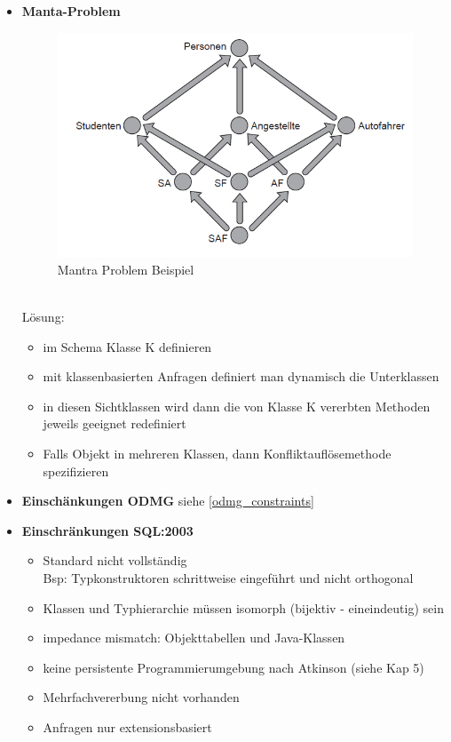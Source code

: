\begin{itemize}
	\item \textbf{Manta-Problem}
	\begin{figure}[!h]
		\centering
		\includegraphics[scale=0.5]{img/mantra_problem_ex.png}
		\caption{Mantra Problem Beispiel}
	\end{figure}\\
	Lösung:
	\begin{itemize}
		\item im Schema Klasse K definieren
		\item mit klassenbasierten Anfragen definiert man dynamisch die Unterklassen
		\item in diesen Sichtklassen wird dann die von Klasse K vererbten Methoden jeweils geeignet redefiniert
		\item Falls Objekt in mehreren Klassen, dann Konfliktauflösemethode spezifizieren
	\end{itemize}
	
	\item \textbf{Einschänkungen ODMG} siehe \ref{odmg_constraints}
	
	\item \textbf{Einschränkungen SQL:2003}
	\begin{itemize}
		\item Standard nicht vollständig \\
		Bsp: Typkonstruktoren schrittweise eingeführt und nicht orthogonal
		\item Klassen und Typhierarchie müssen isomorph (bijektiv - eineindeutig) sein
		\item impedance mismatch: Objekttabellen und Java-Klassen
		\item keine persistente Programmierumgebung nach Atkinson (siehe Kap 5)
		\item Mehrfachvererbung nicht vorhanden
		\item Anfragen nur extensionsbasiert
	\end{itemize}
\end{itemize}